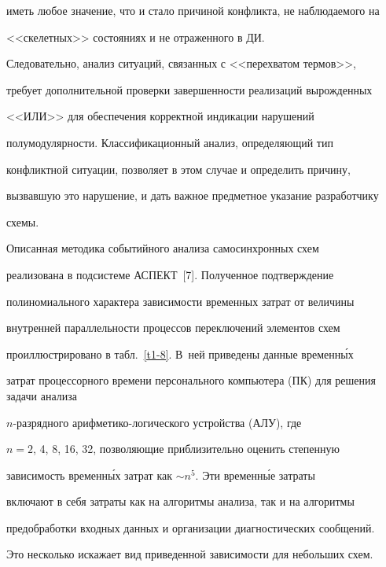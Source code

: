 иметь любое значение, что и стало причиной конфликта, не наблюдаемого на 


<<скелетных>> состояниях и не отраженного в ДИ.


      


      Следовательно, анализ ситуаций, связанных с <<перехватом термов>>, 


требует дополнительной проверки завершенности реализаций вырожденных 


<<ИЛИ>> для обеспечения корректной индикации нарушений 


полумодулярности. Классификационный анализ, определяющий тип 


конфликтной ситуации, позволяет в этом случае и определить причину, 


вызвавшую это нарушение, и дать важное предметное указание разработчику 


схемы.


      


      Описанная методика событийного анализа самосинхронных схем 


реализована в подсистеме АСПЕКТ~[7]. Полученное подтверждение 


полиномиального характера зависимости временных затрат от величины 


внутренней па\-рал\-лель\-ности процессов переключений элементов схем 


проиллюстрировано в табл.~\ref{t1-8}. В~ней приведены данные временн\'{ы}х 


затрат процессорного времени персонального компьютера (ПК) для решения задачи анализа 


      $n$-раз\-ряд\-но\-го ариф\-ме\-ти\-ко-ло\-ги\-че\-ско\-го устройства (АЛУ), где 


$n = 2$, 4, 8, 16, 32, позволяющие приблизительно оценить степенную 


зависимость временн\'{ы}х затрат как $\sim n^5$. Эти временн\'{ы}е затраты 


включают в себя затраты как на алгоритмы анализа, так и на алгоритмы 


предобработки входных данных и организации диагностических сообщений. 


Это несколько искажает вид приведенной зависимости для небольших схем.


      


